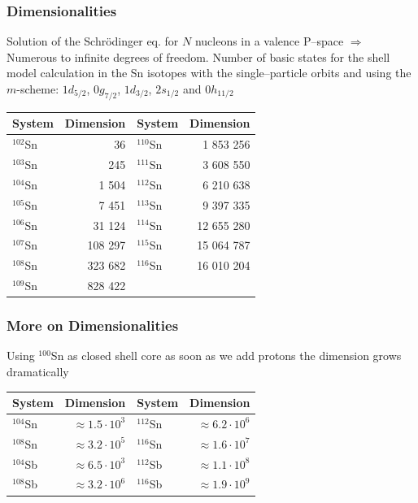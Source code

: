 \documentclass[compress]{beamer}
\begin{document}
 \frame
 {
 \frametitle{Dimensionalities}
 \begin{small}
 {\scriptsize
 Solution of the Schr\"{o}dinger eq. for $N$ nucleons
 in a valence P--space $\Longrightarrow$ Numerous to infinite
 degrees of freedom.
 Number of basic states for the shell model calculation
 in the Sn isotopes with the single--particle orbits and using the $m$-scheme:
 $1d_{5/2}$, $0g_{7/2}$, $1d_{3/2}$, $2s_{1/2}$ and $0h_{11/2}$
 \begin{center}
 \begin{tabular}{|l|r|| l|r|} \hline
 System & Dimension & System & Dimension\\ \hline
 $^{102}$Sn  & 36&  $^{110}$Sn  & 1 853 256\\
 $^{103}$Sn  & 245&  $^{111}$Sn  & 3 608 550\\
 $^{104}$Sn  & 1 504&  $^{112}$Sn  & 6 210 638\\
 $^{105}$Sn  & 7 451&  $^{113}$Sn  & 9 397 335\\
 $^{106}$Sn  & 31 124&  $^{114}$Sn  & 12 655 280\\
 $^{107}$Sn  & 108 297&  $^{115}$Sn  & 15 064 787\\
 $^{108}$Sn  & 323 682&  $^{116}$Sn  & 16 010 204 \\
 $^{109}$Sn  & 828 422&              &           \\ \hline
 \end{tabular}
 \end{center}
 }
 \end{small}
 }

 \frame
 {
   \frametitle{More on Dimensionalities}
 Using $^{100}$Sn as closed shell core as soon 
 as we add protons the dimension grows dramatically
 \begin{center}
 \begin{tabular}{|lrlr|} \hline
 System & Dimension & System & Dimension\\ \hline
 $^{104}$Sn  & $\approx 1.5 \cdot 10^3$&  $^{112}$Sn  & $\approx 6.2 \cdot 10^6$\\
 $^{108}$Sn  & $\approx 3.2 \cdot 10^5$&  $^{116}$Sn  & $\approx 1.6 \cdot 10^7$\\ 
 $^{104}$Sb  & $\approx 6.5 \cdot 10^3$ &  $^{112}$Sb  & $\approx 1.1 \cdot10^8$ \\
 $^{108}$Sb  & $\approx 3.2 \cdot 10^6$ &  $^{116}$Sb  & $\approx 1.9 \cdot 10^9$ \\ \hline\end{tabular}
 \end{center}
 }
\end{document}
